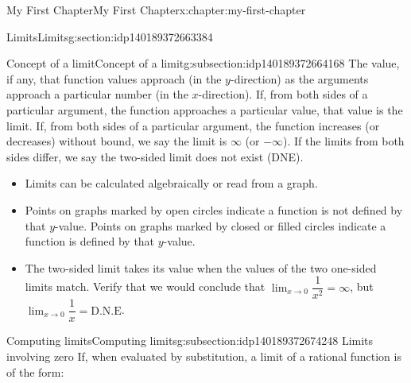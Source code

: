 \documentclass[oneside,10pt,]{book}
\begin{document}
%
%
\typeout{************************************************}
\typeout{************************************************}
%
\begin{chapterptx}{My First Chapter}{}{My First Chapter}{}{}{x:chapter:my-first-chapter}
%
%
\typeout{************************************************}
\typeout{************************************************}
%
\begin{sectionptx}{Limits}{}{Limits}{}{}{g:section:idp140189372663384}
%
%
\typeout{************************************************}
\typeout{************************************************}
%
\begin{subsectionptx}{Concept of a limit}{}{Concept of a limit}{}{}{g:subsection:idp140189372664168}
The value, if any, that function values approach (in the \(y\)-direction) as the arguments approach a particular number (in the \(x\)-direction).  If, from both sides of a particular argument, the function approaches a particular value, that value is the limit.  If, from both sides of a particular argument, the function increases (or decreases) without bound, we say the limit is \(\infty\) (or \(-\infty\)).  If the limits from both sides differ, we say the two-sided limit does not exist (DNE).%
%
\begin{itemize}[label=\textbullet]
\item{}Limits can be calculated algebraically or read from a graph.%
\item{}Points on graphs marked by open circles indicate a function is not defined by that \(y\)-value.  Points on graphs marked by closed or filled circles indicate a function is defined by that \(y\)-value.%
\item{}The two-sided limit takes its value when the values of the two one-sided limits match.  Verify that we would conclude that \(\displaystyle \lim_{x\to0}\dfrac{1}{x^2} = \infty\), but \(\displaystyle \lim_{x\to0}\dfrac{1}{x} = \text{D.N.E}\).%
\end{itemize}
\end{subsectionptx}
%
%
\typeout{************************************************}
\typeout{************************************************}
%
\begin{subsectionptx}{Computing limits}{}{Computing limits}{}{}{g:subsection:idp140189372674248}
Limits involving zero\textbraceright{} If, when evaluated by substitution, a limit of a rational function is of the form:%

\end{subsectionptx}
\end{sectionptx}
\end{chapterptx}
\end{document}
